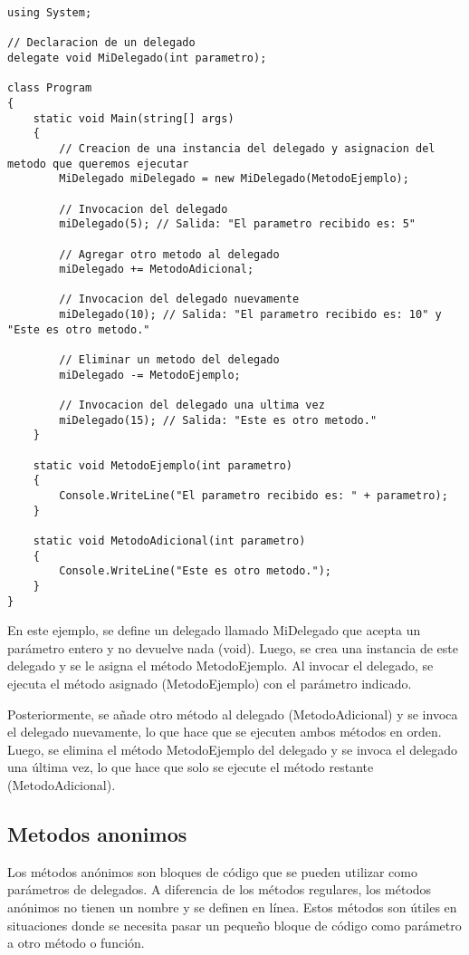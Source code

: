 \documentclass[executivepaper]{article}
\begin{document}
\begin{lstlisting}
using System;

// Declaracion de un delegado
delegate void MiDelegado(int parametro);

class Program
{
    static void Main(string[] args)
    {
        // Creacion de una instancia del delegado y asignacion del metodo que queremos ejecutar
        MiDelegado miDelegado = new MiDelegado(MetodoEjemplo);

        // Invocacion del delegado
        miDelegado(5); // Salida: "El parametro recibido es: 5"

        // Agregar otro metodo al delegado
        miDelegado += MetodoAdicional;

        // Invocacion del delegado nuevamente
        miDelegado(10); // Salida: "El parametro recibido es: 10" y "Este es otro metodo."

        // Eliminar un metodo del delegado
        miDelegado -= MetodoEjemplo;

        // Invocacion del delegado una ultima vez
        miDelegado(15); // Salida: "Este es otro metodo."
    }

    static void MetodoEjemplo(int parametro)
    {
        Console.WriteLine("El parametro recibido es: " + parametro);
    }

    static void MetodoAdicional(int parametro)
    {
        Console.WriteLine("Este es otro metodo.");
    }
}    
\end{lstlisting}

En este ejemplo, se define un delegado llamado MiDelegado que acepta un parámetro entero y no devuelve nada (void). Luego, se crea una instancia de este delegado y se le asigna el método MetodoEjemplo. Al invocar el delegado, se ejecuta el método asignado (MetodoEjemplo) con el parámetro indicado.

Posteriormente, se añade otro método al delegado (MetodoAdicional) y se invoca el delegado nuevamente, lo que hace que se ejecuten ambos métodos en orden. Luego, se elimina el método MetodoEjemplo del delegado y se invoca el delegado una última vez, lo que hace que solo se ejecute el método restante (MetodoAdicional).

\subsection{Metodos anonimos}

Los métodos anónimos son bloques de código que se pueden utilizar como parámetros de delegados. A diferencia de los métodos regulares, los métodos anónimos no tienen un nombre y se definen en línea. Estos métodos son útiles en situaciones donde se necesita pasar un pequeño bloque de código como parámetro a otro método o función.
\end{document}
